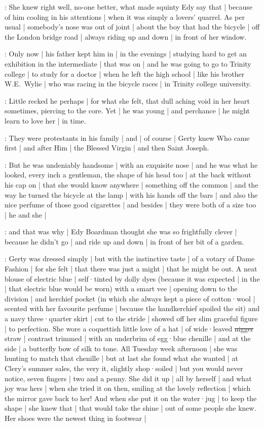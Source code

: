 \gertyJudgy:
She knew right well,
no-one better,
what made squinty Edy say that |
because of him cooling in his attentions |
when it was simply a lovers' quarrel.
As per usual |
somebody's nose was out of joint |%
about the boy that had the bicycle |
off the London bridge road |
always riding up and down |
in front of her window.

\gertyReal:
Only now |
his father kept him in |
in the evenings |
studying hard to get an exhibition in the intermediate |
that was on |
and he was going to go to Trinity college |
to study for a doctor |
when he left the high school |
like his brother W.E.~Wylie |
who was racing in the bicycle races |
in Trinity college university.

\gertyRomantic:
Little recked he perhaps |
for what she felt,
that dull aching void in her heart sometimes,
piercing to the core.
Yet |
he was young |
and perchance |
he might learn to love her |
in time.

\gertyReal:
They were protestants in his family |
and |
of course |
Gerty knew Who came first |
and after Him |
the Blessed Virgin |
and then Saint Joseph.%

\gertyRomantic:
But he was undeniably handsome |
with an exquisite nose |
and he was what he looked,
every inch a gentleman,
the shape of his head too |
at the back without his cap on |
that she would know anywhere |
something off the common |
and the way he turned the bicycle at the lamp |
with his hands off the bars |
and also the nice perfume of those good cigarettes |
and besides |
they were both of a size too |
he and she |

\gertyJudgy:
and that was why |
Edy Boardman thought she was so frightfully clever |
because he didn't go |
and ride up and down |
in front of her bit of a garden.

\gertyReal:
Gerty was dressed simply |
but with the instinctive taste |
of a votary of Dame Fashion |
for she felt |
that there was just a might |
that he might be out.
A neat blouse of electric blue |
self·tinted by dolly dyes
(because it was expected |
in the  |
that electric blue would be worn)
with a smart vee |
opening down to the division |
and kerchief pocket
(in which
she always kept a piece of cotton·wool |
scented with her favourite perfume |
because the handkerchief spoiled the sit)
and a navy three·quarter skirt |
cut to the stride |
showed off her slim graceful figure |
to perfection.
She wore a coquettish little love of a hat |
of wide·leaved \sout{nigger} straw |
contrast trimmed |
with an underbrim of egg·blue chenille |
and at the side |
a butterfly bow of silk to tone.
All Tuesday week afternoon |
she was hunting to match that chenille |
but at last
she found what she wanted |
at Clery's summer sales,
the very it,
slightly shop·soiled |
but you would never notice,%
seven fingers |
two and a penny.
She did it up |
all by herself |
and what joy was hers |
when she tried it on then,
smiling at the lovely reflection |
which the mirror gave back to her!
And when she put it on the water·jug |
to keep the shape |
she knew that |
that would take the shine |
out of some people she knew.
Her shoes were the newest thing in footwear |

